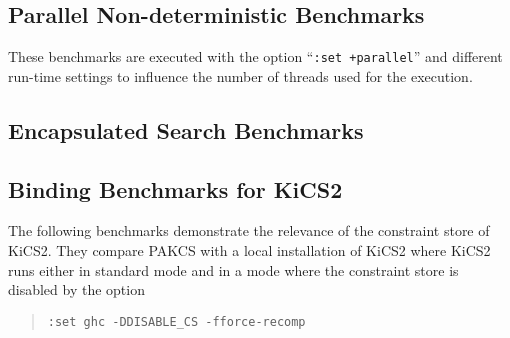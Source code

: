\documentclass{article}
\begin{document}
\subsection{Parallel Non-deterministic Benchmarks}

These benchmarks are executed with the option ``\texttt{:set +parallel}''
and different run-time settings to influence the number
of threads used for the execution.

\begin{center}
\end{center}


\subsection{Encapsulated Search Benchmarks}

\begin{center}
\end{center}


\subsection{Binding Benchmarks for KiCS2}

The following benchmarks demonstrate the relevance of the
constraint store of KiCS2. They compare PAKCS with a local installation
of KiCS2 where KiCS2 runs either in standard mode and
in a mode where the constraint store is disabled by the option
\begin{quote}
\texttt{:set ghc -DDISABLE\_CS -fforce-recomp}
\end{quote}

\begin{center}
\end{center}
\end{document}
